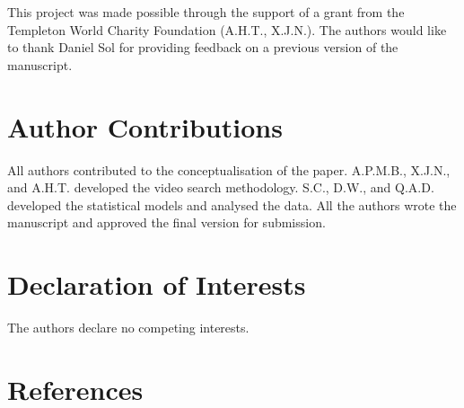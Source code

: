 \documentclass[
  man, donotrepeattitle,floatsintext]{apa6}
\begin{document}
This project was made possible through the support of a grant from the Templeton
World Charity Foundation (A.H.T., X.J.N.). The authors would like to thank
Daniel Sol for providing feedback on a previous version of the manuscript.

\hypertarget{author-contributions}{%
\section{Author Contributions}\label{author-contributions}}

All authors contributed to the conceptualisation of the paper. A.P.M.B., X.J.N.,
and A.H.T. developed the video search methodology. S.C., D.W., and Q.A.D.
developed the statistical models and analysed the data. All the authors wrote
the manuscript and approved the final version for submission.

\hypertarget{declaration-of-interests}{%
\section{Declaration of Interests}\label{declaration-of-interests}}

The authors declare no competing interests.

\newpage

\hypertarget{references}{%
\section{References}\label{references}}

\begingroup
\end{document}

